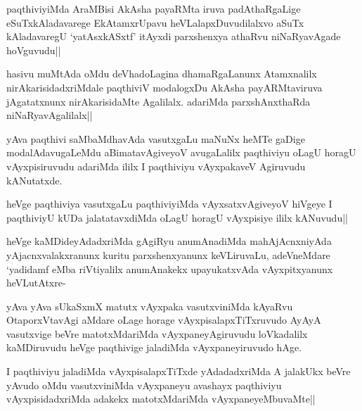 \begin{artha}
paqthiviyiMda AraMBisi AkAsha payaRMta iruva padAthaRgaLige eSuTxkAladavarege EkAtamxrUpavu heVLalapxDuvudilalxvo aSuTx kAladavaregU `yatAsxkASxtf' itAyxdi parxshenxya athaRvu niNaRyavAgade hoVguvudu||
\end{artha}

\begin{artha}%
hasivu muMtAda oMdu deVhadoLagina dhamaRgaLanunx Atamxnalilx nirAkarisidadxriMdale paqthiviV modalogxDu AkAsha payARMtaviruva jAgatatxnunx nirAkarisidaMte Agalilalx. adariMda parxshAnxthaRda niNaRyavAgalilalx||
\end{artha}

\stext


\begin{artha}
yAva paqthivi saMbaMdhavAda vasutxgaLu maNuNx heMTe gaDige modalAdavugaLeMdu aBimatavAgiveyoV avugaLalilx paqthiviyu oLagU horagU vAyxpisiruvudu adariMda ililx I paqthiviyu vAyxpakaveV Agiruvudu kANutatxde. 
\end{artha}

\begin{artha}
heVge paqthiviya vasutxgaLu paqthiviyiMda vAyxsatxvAgiveyoV hiVgeye I paqthiviyU kUDa jalatatavxdiMda oLagU horagU vAyxpisiye ililx kANuvudu||
\end{artha}

\begin{artha}
heVge kaMDideyAdadxriMda gAgiRyu anumAnadiMda mahAjAcnxniyAda yAjacnxvalakxranunx kuritu parxshenxyanunx  keVLiruvaLu, adeVneMdare `yadidamf eMba riVtiyalilx anumAnakekx upayukatxvAda vAyxpitxyanunx heVLutAtxre-
\end{artha}


\begin{artha}
yAva yAva sUkaSxmX matutx vAyxpaka vasutxviniMda kAyaRvu OtaporxVtavAgi aMdare oLage horage vAyxpisalapxTiTxruvudo AyAyA vasutxvige beVre matotxMdariMda vAyxpaneyAgiruvudu loVkadalilx kaMDiruvudu heVge paqthivige jaladiMda vAyxpaneyiruvudo hAge. 
\end{artha}

\begin{artha}
I paqthiviyu jaladiMda vAyxpisalapxTiTxde yAdadadxriMda A jalakUkx beVre yAvudo oMdu vasutxviniMda vAyxpaneyu avashayx paqthiviyu vAyxpisidadxriMda adakekx matotxMdariMda vAyxpaneyeMbuvaMte||
\end{artha}


